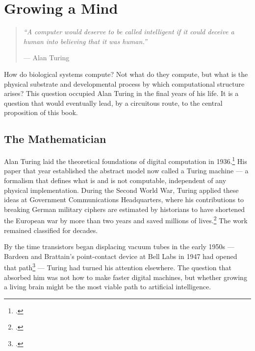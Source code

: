 
\chapter{Growing a Mind}
\label{pos14:growing-a-mind}


\begin{quote}
\textit{``A computer would deserve to be called intelligent if it could deceive a human into believing that it was human.''}

\hfill --- Alan Turing
\end{quote}
\vspace{0.5cm}


How do biological systems compute?  Not what do they compute, but what is the physical substrate and developmental process by which computational structure arises?  This question occupied Alan Turing in the final years of his life. It is a question that would eventually lead, by a circuitous route, to the central proposition of this book.

\section*{The Mathematician}

Alan Turing laid the theoretical foundations of digital computation in 1936.\footcite{turing1936} His paper that year established the abstract model now called a Turing machine --- a formalism that defines what is and is not computable, independent of any physical implementation. During the Second World War, Turing applied these ideas at Government Communications Headquarters, where his contributions to breaking German military ciphers are estimated by historians to have shortened the European war by more than two years and saved millions of lives.\footcite{winterbotham1974} The work remained classified for decades.

By the time transistors began displacing vacuum tubes in the early 1950s --- Bardeen and Brattain's point-contact device at Bell Labs in 1947 had opened that path\footcite{bardeen1948} --- Turing had turned his attention elsewhere. The question that absorbed him was not how to make faster digital machines, but whether growing a living brain might be the most viable path to artificial intelligence.

